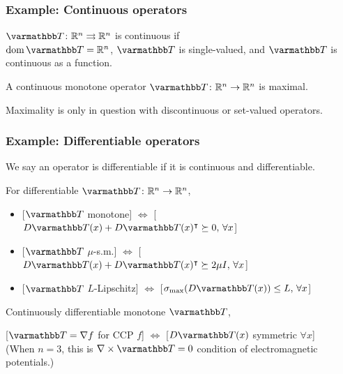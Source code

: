\documentclass[10pt,mathserif]{beamer}
\begin{document}
\begin{frame}
\frametitle{Example: Continuous operators}
$\opT\colon\reals^n\rightrightarrows \reals^n$ is continuous if\\
$\dom \opT=\reals^n$, $\opT$ is single-valued, and $\opT$ is  continuous as a function.
\vspace{0.2in}


A continuous monotone operator $\opT \colon\reals^n\rightarrow\reals^n$ is maximal.
\vspace{0.2in}

Maximality is only in question with discontinuous or set-valued operators.
\end{frame}


\begin{frame}
\frametitle{Example: Differentiable operators}
We say an operator is differentiable if it is continuous and differentiable.

\vspace{0.2in}
For differentiable $\opT \colon \reals^n \rightarrow \reals^n$,
\begin{itemize}
\item

[$\opT$ monotone] $\Leftrightarrow$ [$D\opT (x)+D\opT (x)^\intercal \succeq 0,\,\forall x$]

\item

[$\opT$ $\mu$-s.m.]  $\Leftrightarrow$ [$D\opT (x)+D\opT (x)^\intercal \succeq 2\mu I,\,\forall x$]
\item

[$\opT$ $L$-Lipschitz] $\Leftrightarrow$ [$\sigma_\mathrm{max}(D\opT (x))\le L,\,\forall x$]
\end{itemize}

\vspace{0.2in}


Continuously differentiable monotone $\opT $,

[$\opT=\nabla f$ for CCP $f$] $\Leftrightarrow$ [$D\opT (x)$ symmetric $\forall x$]\\
(When $n=3$, this is $\nabla\times\opT=0$ condition of electromagnetic potentials.)
\end{frame}
\end{document}
